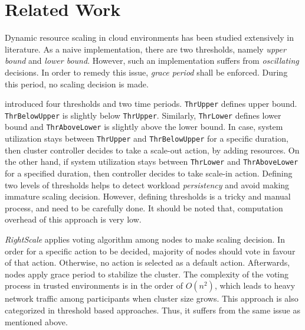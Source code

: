 \chapter{Related Work}
Dynamic resource scaling in cloud environments has been studied extensively in literature. As a naive implementation, there are two thresholds, namely \emph{upper bound} and \emph{lower bound}. However, such an implementation suffers from \emph{oscillating} decisions. In order to remedy this issue, \emph{grace period} shall be enforced. During this period, no scaling decision is made. \newline

\textcite{Hasan2012IntegratedAA} introduced four thresholds and two time periods. \lstinline$ThrUpper$ defines upper bound. \lstinline$ThrBelowUpper$ is slightly below \lstinline$ThrUpper$. Similarly, \lstinline$ThrLower$ defines lower bound and \lstinline$ThrAboveLower$ is slightly above the lower bound. In case, system utilization stays between \lstinline$ThrUpper$ and \lstinline$ThrBelowUpper$ for a specific duration, then cluster controller decides to take a scale-out action, by adding resources. On the other hand, if system utilization stays between \lstinline$ThrLower$ and \lstinline$ThrAboveLower$ for a specified duration, then controller decides to take scale-in action. Defining two levels of thresholds helps to detect workload \emph{persistency} and avoid making immature scaling decision. However, defining thresholds is a tricky and manual process, and need to be carefully done\cite{Dutreilh2010}. It should be noted that, computation overhead of this approach is very low. \newline

\emph{RightScale} applies voting algorithm\cite{RightScale} among nodes to make scaling decision. In order for a specific action to be decided, majority of nodes should vote in favour of that action. Otherwise, no action is selected as a default action. Afterwards, nodes apply grace period to stabilize the cluster. The complexity of the voting process in trusted environments is in the order of $O(n^2)$, which leads to heavy network traffic among participants when cluster size grows. This approach is also categorized in threshold based approaches. Thus, it suffers from the same issue as mentioned above.\newline

